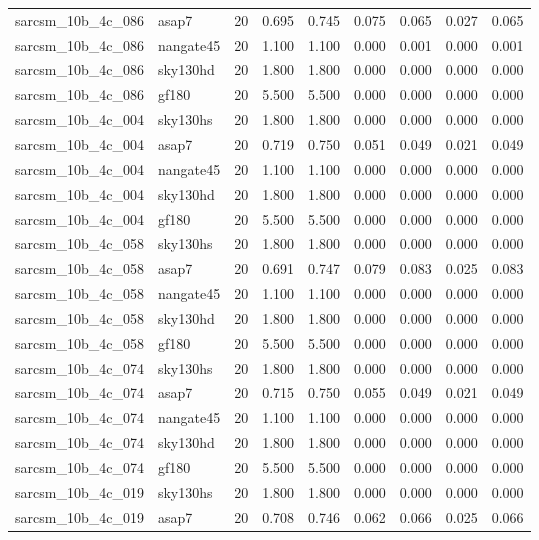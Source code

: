 \begin{tabular}{llrrrrrrr}
sarcsm\_10b\_4c\_086 & asap7 & 20 & 0.695 & 0.745 & 0.075 & 0.065 & 0.027 & 0.065 \\
sarcsm\_10b\_4c\_086 & nangate45 & 20 & 1.100 & 1.100 & 0.000 & 0.001 & 0.000 & 0.001 \\
sarcsm\_10b\_4c\_086 & sky130hd & 20 & 1.800 & 1.800 & 0.000 & 0.000 & 0.000 & 0.000 \\
sarcsm\_10b\_4c\_086 & gf180 & 20 & 5.500 & 5.500 & 0.000 & 0.000 & 0.000 & 0.000 \\
sarcsm\_10b\_4c\_004 & sky130hs & 20 & 1.800 & 1.800 & 0.000 & 0.000 & 0.000 & 0.000 \\
sarcsm\_10b\_4c\_004 & asap7 & 20 & 0.719 & 0.750 & 0.051 & 0.049 & 0.021 & 0.049 \\
sarcsm\_10b\_4c\_004 & nangate45 & 20 & 1.100 & 1.100 & 0.000 & 0.000 & 0.000 & 0.000 \\
sarcsm\_10b\_4c\_004 & sky130hd & 20 & 1.800 & 1.800 & 0.000 & 0.000 & 0.000 & 0.000 \\
sarcsm\_10b\_4c\_004 & gf180 & 20 & 5.500 & 5.500 & 0.000 & 0.000 & 0.000 & 0.000 \\
sarcsm\_10b\_4c\_058 & sky130hs & 20 & 1.800 & 1.800 & 0.000 & 0.000 & 0.000 & 0.000 \\
sarcsm\_10b\_4c\_058 & asap7 & 20 & 0.691 & 0.747 & 0.079 & 0.083 & 0.025 & 0.083 \\
sarcsm\_10b\_4c\_058 & nangate45 & 20 & 1.100 & 1.100 & 0.000 & 0.000 & 0.000 & 0.000 \\
sarcsm\_10b\_4c\_058 & sky130hd & 20 & 1.800 & 1.800 & 0.000 & 0.000 & 0.000 & 0.000 \\
sarcsm\_10b\_4c\_058 & gf180 & 20 & 5.500 & 5.500 & 0.000 & 0.000 & 0.000 & 0.000 \\
sarcsm\_10b\_4c\_074 & sky130hs & 20 & 1.800 & 1.800 & 0.000 & 0.000 & 0.000 & 0.000 \\
sarcsm\_10b\_4c\_074 & asap7 & 20 & 0.715 & 0.750 & 0.055 & 0.049 & 0.021 & 0.049 \\
sarcsm\_10b\_4c\_074 & nangate45 & 20 & 1.100 & 1.100 & 0.000 & 0.000 & 0.000 & 0.000 \\
sarcsm\_10b\_4c\_074 & sky130hd & 20 & 1.800 & 1.800 & 0.000 & 0.000 & 0.000 & 0.000 \\
sarcsm\_10b\_4c\_074 & gf180 & 20 & 5.500 & 5.500 & 0.000 & 0.000 & 0.000 & 0.000 \\
sarcsm\_10b\_4c\_019 & sky130hs & 20 & 1.800 & 1.800 & 0.000 & 0.000 & 0.000 & 0.000 \\
sarcsm\_10b\_4c\_019 & asap7 & 20 & 0.708 & 0.746 & 0.062 & 0.066 & 0.025 & 0.066 \\

\end{tabular}
